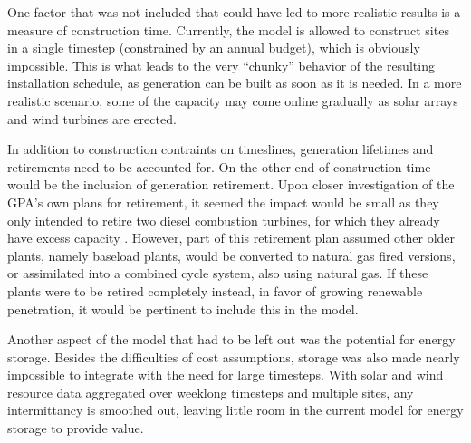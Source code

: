 \documentclass[12pt,letterpaper,fleqn]{article}
\begin{document}
One factor that was not included that could have led to more realistic
results is a measure of construction time. Currently, the model is
allowed to construct sites in a single timestep (constrained by an
annual budget), which is obviously impossible. This is what leads to
the very ``chunky'' behavior of the resulting installation schedule,
as generation can be built as soon as it is needed. In a more
realistic scenario, some of the capacity may come online gradually as
solar arrays and wind turbines are erected.

In addition to construction contraints on timeslines, generation
lifetimes and retirements need to be accounted for. On the other end
of construction time would be the inclusion of generation
retirement. Upon closer investigation of the GPA's own plans for
retirement, it seemed the impact would be small as they only intended
to retire two diesel combustion turbines, for which they already have
excess capacity \cite{cruz13}. However, part of this retirement plan
assumed other older plants, namely baseload plants, would be converted
to natural gas fired versions, or assimilated into a combined cycle
system, also using natural gas.  If these plants were to be retired
completely instead, in favor of growing renewable penetration, it
would be pertinent to include this in the model.

Another aspect of the model that had to be left out was the potential
for energy storage. Besides the difficulties of cost assumptions,
storage was also made nearly impossible to integrate with the need for
large timesteps. With solar and wind resource data aggregated over
weeklong timesteps and multiple sites, any intermittancy is smoothed
out, leaving little room in the current model for energy storage to
provide value.
\end{document}
